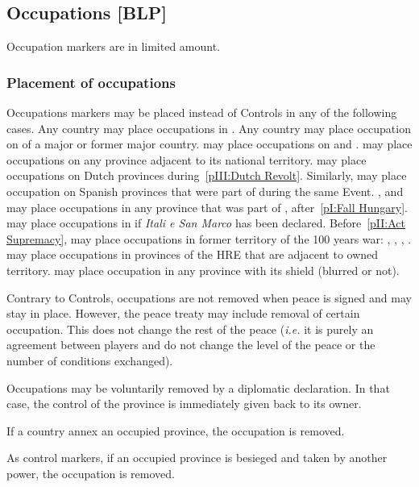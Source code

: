 \subsection{Occupations [BLP]}
\aparag Occupation markers are in limited amount.

\subsubsection{Placement of occupations}
\aparag Occupations markers may be placed instead of Controls in any
of the following cases.
\bparag Any country may place occupations in \continentCaraibes.
\bparag[] [TBD] Any country may place occupation on \TP of a major or
former major country.
\bparag \POR may place occupations on \paysOman and \paysAden.
\bparag \RUS may place occupations on any province adjacent to its
national territory.
\bparag \HIS may place occupations on Dutch provinces
during~\ref{pIII:Dutch Revolt}. Similarly, \HOL may place occupation
on Spanish provinces that were part of \paysBourgogne during the same
Event.
\bparag \TUR, \AUS and \POL may place occupations in any province that
was part of \paysHongrie, after~\ref{pI:Fall Hungary}.
\bparag[] [TBD] \VEN may place occupations in \regionItalie if
\emph{Itali e San Marco} has been declared.
\bparag[] [TBD] Before~\ref{pII:Act Supremacy}, \ANG may place
occupations in former territory of the 100 years war:
\provinceGuyenne, \provinceQuercy, \provincePoitou, \provincePicardie.
\bparag \FRA may place occupations in provinces of the HRE that are
adjacent to owned territory.
\bparag \paysSavoie may place occupation in any province with its
shield (blurred or not).

\aparag Contrary to Controls, occupations are not removed when peace
is signed and may stay in place.
\bparag However, the peace treaty may include removal of certain
occupation. This does not change the rest of the peace (\emph{i.e.} it
is purely an agreement between players and do not change the level of
the peace or the number of conditions exchanged).

\aparag Occupations may be voluntarily removed by a diplomatic
declaration. In that case, the control of the province is immediately
given back to its owner.

\aparag If a country annex an occupied province, the occupation is
removed.

\aparag As control markers, if an occupied province is besieged and
taken by another power, the occupation is removed.

